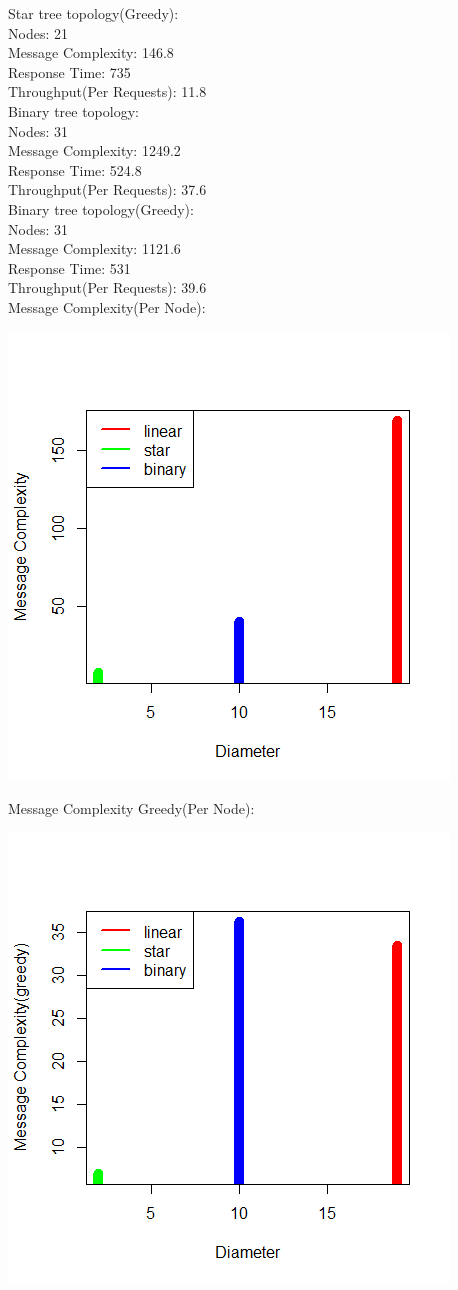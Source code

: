 \documentclass{article}
\begin{document}
\noindent
Star tree topology(Greedy): \\
Nodes: 21 \\
Message Complexity: 146.8\\
Response Time: 735\\
Throughput(Per Requests): 11.8\\

\noindent
Binary tree topology: \\
Nodes: 31\\
Message Complexity: 1249.2\\
Response Time: 524.8\\
Throughput(Per Requests): 37.6\\

\noindent
Binary tree topology(Greedy): \\
Nodes: 31\\
Message Complexity: 1121.6\\
Response Time: 531\\
Throughput(Per Requests): 39.6\\

\pagebreak
Message Complexity(Per Node):

\begin{center}
    \includegraphics[width=.6\textwidth]{figs/s1} \\
\end{center}

Message Complexity Greedy(Per Node):

\begin{center}
    \includegraphics[width=.6\textwidth]{figs/s2} \\
\end{center}
\end{document}
